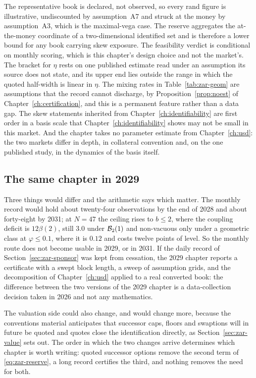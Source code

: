 \documentclass[../../../main.tex]{subfiles}
\begin{document}
The representative book is declared, not observed, so every rand figure is illustrative, undiscounted by assumption~A7 and struck at the money by assumption~A3, which is the maximal-vega case. The reserve aggregates the at-the-money coordinate of a two-dimensional identified set and is therefore a lower bound for any book carrying skew exposure. The feasibility verdict is conditional on monthly scoring, which is this chapter's design choice and not the market's. The bracket for $\eta$ rests on one published estimate read under an assumption its source does not state, and its upper end lies outside the range in which the quoted half-width is linear in $\eta$. The mixing rates in Table~\ref{tab:zar-geom} are assumptions that the record cannot discharge, by Proposition~\ref{prop:noest} of Chapter~\ref{ch:certification}, and this is a permanent feature rather than a data gap. The skew statements inherited from Chapter~\ref{ch:identifiability} are first order in a basis scale that Chapter~\ref{ch:identifiability} shows may not be small in this market. And the chapter takes no parameter estimate from Chapter~\ref{ch:usd}: the two markets differ in depth, in collateral convention and, on the one published study, in the dynamics of the basis itself.

\subsection{The same chapter in 2029}

Three things would differ and the arithmetic says which matter. The monthly record would hold about twenty-four observations by the end of 2028 and about forty-eight by 2031; at $N=47$ the ceiling rises to $b\le2$, where the coupling deficit is $12\beta(2)$, still $3.0$ under $\mathcal B_{2}(1)$ and non-vacuous only under a geometric class at $\varphi\le0.1$, where it is $0.12$ and costs twelve points of level. So the monthly route does not become usable in 2029, or in 2031. If the daily record of Section~\ref{sec:zar-sponsor} was kept from cessation, the 2029 chapter reports a certificate with a swept block length, a sweep of assumption grids, and the decomposition of Chapter~\ref{ch:usd} applied to a real converted book: the difference between the two versions of the 2029 chapter is a data-collection decision taken in 2026 and not any mathematics.

The valuation side could also change, and would change more, because the conventions material anticipates that successor caps, floors and swaptions will in future be quoted \citep[\S3, p.~5]{sarb2024conv} and quotes close the identification directly, as Section~\ref{sec:zar-value} sets out. The order in which the two changes arrive determines which chapter is worth writing: quoted successor options remove the second term of \eqref{eq:zar-reserve}, a long record certifies the third, and nothing removes the need for both.
\end{document}
